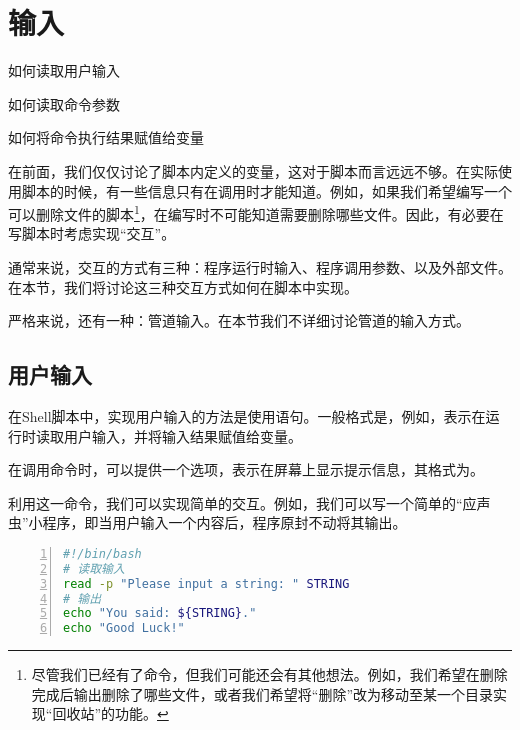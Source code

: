 \section{输入}\label{sec:输入}

\begin{Abstract}
    \item 如何读取用户输入
    \item 如何读取命令参数
    \item 如何将命令执行结果赋值给变量
\end{Abstract}

在前面，我们仅仅讨论了脚本内定义的变量，这对于脚本而言远远不够。在实际使用脚本的时候，有一些信息只有在调用时才能知道。例如，如果我们希望编写一个可以删除文件的脚本\footnote{尽管我们已经有了命令，但我们可能还会有其他想法。例如，我们希望在删除完成后输出删除了哪些文件，或者我们希望将“删除”改为移动至某一个目录实现“回收站”的功能。}，在编写时不可能知道需要删除哪些文件。因此，有必要在写脚本时考虑实现“交互”。

通常来说，交互的方式有三种：程序运行时输入、程序调用参数、以及外部文件。在本节，我们将讨论这三种交互方式如何在脚本中实现。

\begin{attention}
    严格来说，还有一种：管道输入。在本节我们不详细讨论管道的输入方式。
\end{attention}

\subsection{用户输入}\label{subsec:输入-用户输入}

在Shell脚本中，实现用户输入的方法是使用语句。一般格式是，例如，表示在运行时读取用户输入，并将输入结果赋值给变量。

在调用命令时，可以提供一个选项，表示在屏幕上显示提示信息，其格式为。

利用这一命令，我们可以实现简单的交互。例如，我们可以写一个简单的“应声虫”小程序，即当用户输入一个内容后，程序原封不动将其输出。

\begin{lstlisting}[language=bash,caption=my\_echo,numbers=left]
#!/bin/bash
# 读取输入
read -p "Please input a string: " STRING
# 输出
echo "You said: ${STRING}."
echo "Good Luck!"
\end{lstlisting}

